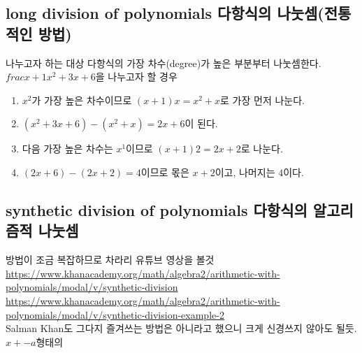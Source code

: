 \documentclass{article}
\begin{document}
\subsection {long division of polynomials 다항식의 나눗셈(전통적인 방법)}
나누고자 하는 대상 다항식의 가장 차수(degree)가 높은 부분부터 나눗셈한다.
$frac{x+1}{x^{2}+3x+6}$을 나누고자 할 경우
\begin {enumerate}
\item $x^{2}$가 가장 높은 차수이므로 $(x+1)x = x^{2}+x$로 가장 먼저 나눈다.
\item $(x^{2}+3x+6)-(x^{2}+x)=2x+6$이 된다.
\item 다음 가장 높은 차수는 $x^{1}$이므로 $(x+1)2 = 2x+2$로 나눈다.
\item $(2x+6)-(2x+2) = 4$이므로 몫은 $x+2$이고, 나머지는 $4$이다.
\end {enumerate}

\subsection {synthetic division of polynomials 다항식의 알고리즘적 나눗셈}
방법이 조금 복잡하므로 차라리 유튜브 영상을 볼것
\vspace{12pt}\\
\url{https://www.khanacademy.org/math/algebra2/arithmetic-with-polynomials/modal/v/synthetic-division}
\vspace{12pt}\\
\url{https://www.khanacademy.org/math/algebra2/arithmetic-with-polynomials/modal/v/synthetic-division-example-2}\\
Salman Khan도 그다지 즐겨쓰는 방법은 아니라고 했으니 크게 신경쓰지 않아도 될듯. $x+-a$형태의 
\end{document}
